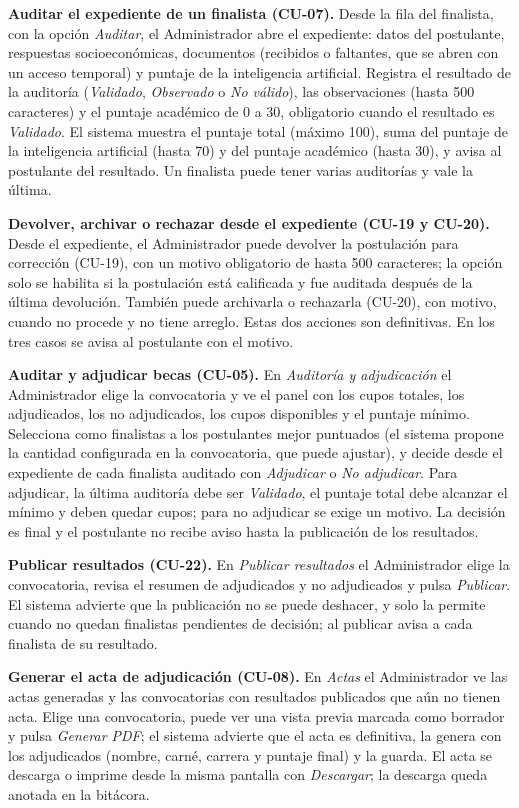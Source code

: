 \textbf{Auditar el expediente de un finalista (CU-07).} Desde la fila del finalista, con la opción \textit{Auditar}, el Administrador abre el expediente: datos del postulante, respuestas socioeconómicas, documentos (recibidos o faltantes, que se abren con un acceso temporal) y puntaje de la inteligencia artificial. Registra el resultado de la auditoría (\textit{Validado}, \textit{Observado} o \textit{No válido}), las observaciones (hasta 500 caracteres) y el puntaje académico de 0 a 30, obligatorio cuando el resultado es \textit{Validado}. El sistema muestra el puntaje total (máximo 100), suma del puntaje de la inteligencia artificial (hasta 70) y del puntaje académico (hasta 30), y avisa al postulante del resultado. Un finalista puede tener varias auditorías y vale la última.

\textbf{Devolver, archivar o rechazar desde el expediente (CU-19 y CU-20).} Desde el expediente, el Administrador puede devolver la postulación para corrección (CU-19), con un motivo obligatorio de hasta 500 caracteres; la opción solo se habilita si la postulación está calificada y fue auditada después de la última devolución. También puede archivarla o rechazarla (CU-20), con motivo, cuando no procede y no tiene arreglo. Estas dos acciones son definitivas. En los tres casos se avisa al postulante con el motivo.

\textbf{Auditar y adjudicar becas (CU-05).} En \textit{Auditoría y adjudicación} el Administrador elige la convocatoria y ve el panel con los cupos totales, los adjudicados, los no adjudicados, los cupos disponibles y el puntaje mínimo. Selecciona como finalistas a los postulantes mejor puntuados (el sistema propone la cantidad configurada en la convocatoria, que puede ajustar), y decide desde el expediente de cada finalista auditado con \textit{Adjudicar} o \textit{No adjudicar}. Para adjudicar, la última auditoría debe ser \textit{Validado}, el puntaje total debe alcanzar el mínimo y deben quedar cupos; para no adjudicar se exige un motivo. La decisión es final y el postulante no recibe aviso hasta la publicación de los resultados.

\textbf{Publicar resultados (CU-22).} En \textit{Publicar resultados} el Administrador elige la convocatoria, revisa el resumen de adjudicados y no adjudicados y pulsa \textit{Publicar}. El sistema advierte que la publicación no se puede deshacer, y solo la permite cuando no quedan finalistas pendientes de decisión; al publicar avisa a cada finalista de su resultado.

\textbf{Generar el acta de adjudicación (CU-08).} En \textit{Actas} el Administrador ve las actas generadas y las convocatorias con resultados publicados que aún no tienen acta. Elige una convocatoria, puede ver una vista previa marcada como borrador y pulsa \textit{Generar PDF}; el sistema advierte que el acta es definitiva, la genera con los adjudicados (nombre, carné, carrera y puntaje final) y la guarda. El acta se descarga o imprime desde la misma pantalla con \textit{Descargar}; la descarga queda anotada en la bitácora.

